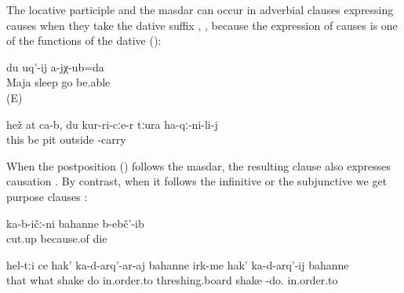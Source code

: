 The locative participle and the masdar can occur in adverbial clauses expressing causes when they take the dative suffix , , because the expression of causes is one of the functions of the dative ():
%
\begin{exe}
	\ex	\label{ex:ecause Maja was sleeping I (masc.) could not come.}
		du	uq'-ij	a-jχ-ub=da\\
		Maja	sleep		go	be.able\\
	\glt	{} (E)

	\ex	\label{ex:This is for you, because you helped me out of the pit}
	\gll	hež	at	ca-b,	du	kur-ri-cːe-r	tːura	ha-qː-ni-li-j\\
		this		be		pit	outside	-carry\\
	\glt	{}
\end{exe}

When the postposition   () follows the masdar, the resulting clause also expresses causation . By contrast, when it follows the infinitive or the subjunctive we get purpose clauses :
%
\begin{exe}
	\ex	\label{ex:‎Because they cut it, they died}
	\gll	ka-b-ičː-ni	bahanne	b-ebč'-ib\\
		cut.up	because.of	die\\
	\glt	{}


	\ex	\label{ex:‎in order to shake those, in order to shake the threshing boards}
	\gll	hel-tːi	ce	hak'	ka-d-arq'-ar-aj	bahanne	irk-me	hak'	ka-d-arq'-ij	bahanne\\
		that	what	shake	do	in.order.to	threshing.board	shake	-do.	in.order.to\\
	\glt	{}
\end{exe}


